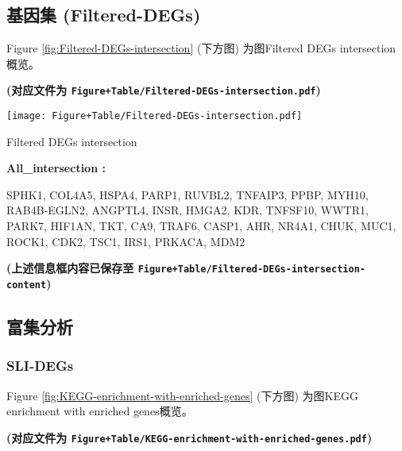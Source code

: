 \documentclass[
]{article}
\begin{document}
\hypertarget{ux57faux56e0ux96c6-filtered-degs}{%
\subsection{基因集 (Filtered-DEGs)}\label{ux57faux56e0ux96c6-filtered-degs}}

Figure \ref{fig:Filtered-DEGs-intersection} (下方图) 为图Filtered DEGs intersection概览。

\textbf{(对应文件为 \texttt{Figure+Table/Filtered-DEGs-intersection.pdf})}

\def\@captype{figure}
\begin{center}
\texttt{[image: Figure+Table/Filtered-DEGs-intersection.pdf]}
\caption{Filtered DEGs intersection}\label{fig:Filtered-DEGs-intersection}
\end{center}
\begin{center}\begin{tcolorbox}[colback=gray!10, colframe=gray!50, width=0.9\linewidth, arc=1mm, boxrule=0.5pt]
\textbf{
All\_intersection
:}

\vspace{0.5em}

    SPHK1, COL4A5, HSPA4, PARP1, RUVBL2, TNFAIP3, PPBP,
MYH10, RAB4B-EGLN2, ANGPTL4, INSR, HMGA2, KDR, TNFSF10,
WWTR1, PARK7, HIF1AN, TKT, CA9, TRAF6, CASP1, AHR, NR4A1,
CHUK, MUC1, ROCK1, CDK2, TSC1, IRS1, PRKACA, MDM2

\vspace{2em}
\end{tcolorbox}
\end{center}

\textbf{(上述信息框内容已保存至 \texttt{Figure+Table/Filtered-DEGs-intersection-content})}

\hypertarget{ux5bccux96c6ux5206ux6790}{%
\subsection{富集分析}\label{ux5bccux96c6ux5206ux6790}}

\hypertarget{sli-degs}{%
\subsubsection{SLI-DEGs}\label{sli-degs}}

Figure \ref{fig:KEGG-enrichment-with-enriched-genes} (下方图) 为图KEGG enrichment with enriched genes概览。

\textbf{(对应文件为 \texttt{Figure+Table/KEGG-enrichment-with-enriched-genes.pdf})}
\end{document}
